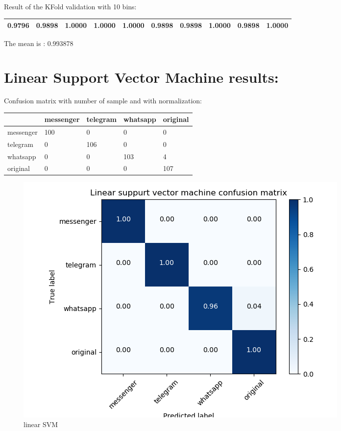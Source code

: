 Result of the KFold validation with 10 bins:
 {\def\arraystretch{1.3} 
 \begin{table}[H] 
\centering 
\begin{tabular}{|l |l |l |l |l |l |l |l |l |l |}  
\hline 
0.9796&
0.9898&
1.0000&
1.0000&
1.0000&
0.9898&
0.9898&
1.0000&
0.9898&
1.0000\\ \hline  

\end{tabular} 
\end{table} }

The mean is : 0.993878\section{Linear Support Vector Machine results:}Confusion matrix with number of sample and with normalization:
 {\def\arraystretch{1.3} 
 \begin{table}[H] 
\centering 
\begin{tabular}{|l|l|l|l|l|} 
\hline 
  &messenger  &telegram  &whatsapp  &original  \\ \hline
messenger  &100  &0  &0  &0  \\ \hline
telegram  &0  &106  &0  &0  \\ \hline
whatsapp  &0  &0  &103  &4  \\ \hline
original  &0  &0  &0  &107  \\ \hline
\end{tabular} 
\end{table} }

 \begin{figure}[H] 
\centering 
\includegraphics[scale=.6]{images/lsvm_initial.png} 
\caption{linear SVM} 
\end{figure} 


